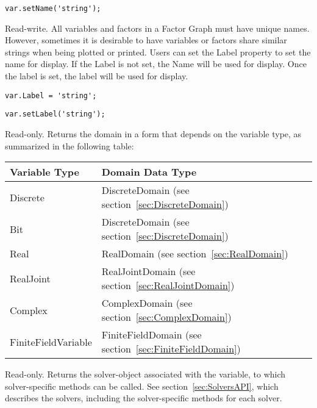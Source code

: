 \fi

\ifjava
\begin{lstlisting}
var.setName('string');
\end{lstlisting}

\fi


Read-write. All variables and factors in a Factor Graph must have unique names. However, sometimes it is desirable to have variables or factors share similar strings when being plotted or printed. Users can set the Label property to set the name for display. If the Label is not set, the Name will be used for display. Once the label is set, the label will be used for display.

\ifmatlab
\begin{lstlisting}
var.Label = 'string';
\end{lstlisting}
\fi

\ifjava
\begin{lstlisting}
var.setLabel('string');
\end{lstlisting}
\fi



Read-only.  Returns the domain in a form that depends on the variable type, as summarized in the following table:

\begin{longtable} {l | p{7cm}}
Variable Type & Domain Data Type \\
\hline
\endhead
Discrete & DiscreteDomain (see section~\ref{sec:DiscreteDomain}) \\
Bit & DiscreteDomain (see section~\ref{sec:DiscreteDomain}) \\
Real & RealDomain (see section~\ref{sec:RealDomain}) \\
RealJoint & RealJointDomain (see section~\ref{sec:RealJointDomain}) \\ 
Complex & ComplexDomain (see section~\ref{sec:ComplexDomain}) \\
FiniteFieldVariable & FiniteFieldDomain (see section~\ref{sec:FiniteFieldDomain}) \\
\end{longtable} 



Read-only.  Returns the solver-object associated with the variable, to which solver-specific methods can be called.  See section~\ref{sec:SolversAPI}, which describes the solvers, including the solver-specific methods for each solver.

\label{sec:Variable.Guess}

